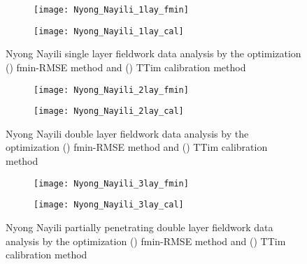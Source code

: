 \begin{figure}[h!]
	\centering
	\begin{subfigure}[b]{\linewidth}
		\centering\texttt{[image: Nyong\_Nayili\_1lay\_fmin]}
		\captionsetup{justification=centering}		
		\caption{\label{fig:Nyong_Nayili_1lay_fmin}}
		\end{subfigure}\vfill
	\begin{subfigure}[b]{\linewidth}
		\centering\texttt{[image: Nyong\_Nayili\_1lay\_cal]}
		\captionsetup{justification=centering}		
		\caption{\label{fig:Nyong_Nayili_1lay_cal}}
		\end{subfigure}
	\captionsetup{justification=centering}	
	\caption{Nyong Nayili single layer fieldwork data analysis by the optimization () fmin-RMSE method and () TTim calibration method} 
	\label{fig:Nyong_Nayili_1lay_analysis}
\end{figure} 

\begin{figure}[h!]
	\centering
	\begin{subfigure}[b]{\linewidth}
		\centering\texttt{[image: Nyong\_Nayili\_2lay\_fmin]}
		\captionsetup{justification=centering}		
		\caption{\label{fig:Nyong_Nayili_2lay_fmin}}
		\end{subfigure}\vfill
	\begin{subfigure}[b]{\linewidth}
		\centering\texttt{[image: Nyong\_Nayili\_2lay\_cal]}
		\captionsetup{justification=centering}		
		\caption{\label{fig:Nyong_Nayili_2lay_cal}}
		\end{subfigure}
	\captionsetup{justification=centering}	
	\caption{Nyong Nayili double layer fieldwork data analysis by the optimization () fmin-RMSE method and () TTim calibration method} 
	\label{fig:Nyong_Nayili_2lay_analysis}
\end{figure} 

\begin{figure}[h!]
	\centering
	\begin{subfigure}[b]{\linewidth}
		\centering\texttt{[image: Nyong\_Nayili\_3lay\_fmin]}
		\captionsetup{justification=centering}		
		\caption{\label{fig:Nyong_Nayili_3lay_fmin}}
		\end{subfigure}\vfill
	\begin{subfigure}[b]{\linewidth}
		\centering\texttt{[image: Nyong\_Nayili\_3lay\_cal]}
		\captionsetup{justification=centering}		
		\caption{\label{fig:Nyong_Nayili_3lay_cal}}
		\end{subfigure}
	\captionsetup{justification=centering}	
	\caption{Nyong Nayili partially penetrating double layer fieldwork data analysis by the optimization () fmin-RMSE method and () TTim calibration method} 
	\label{fig:Nyong_Nayili_3lay_analysis}
\end{figure} 

